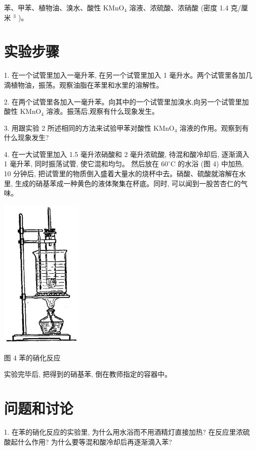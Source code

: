 \documentclass[10pt]{article}
\begin{document}
苯、甲苯、植物油、溴水、酸性 \({\mathrm{{KMnO}}}_{4}\) 溶液、浓硫酸、浓硝酸 (密度 1.4 克/厘米 \({}^{3}\) )。

\section*{实验步骤}

1. 在一个试管里加入一毫升苯, 在另一个试管里加入 1 毫升水。两个试管里各加几滴植物油，振荡。观察油脂在苯里和水里的溶解性。

2. 在两个试管里各加入一毫升苯。向其中的一个试管里加溴水,向另一个试管里加酸性 \({\mathrm{{KMnO}}}_{4}\) 溶液。振荡后,观察有什么现象发生。

3. 用跟实验 2 所述相同的方法来试验甲苯对酸性 \({\mathrm{{KMnO}}}_{4}\) 溶液的作用。观察到有什么现象发生?

4. 在一大试管里加入 1.5 毫升浓硝酸和 2 毫升浓硫酸, 待混和酸冷却后, 逐渐滴入 1 毫升苯, 同时振荡试管, 使它混和均匀。 然后放在 \({60}^{ \circ }\mathrm{C}\) 的水浴 (图 4) 中加热, 10 分钟后, 把试管里的物质倒入盛着大量水的烧杯中去。硝酸、硫酸就溶解在水里, 生成的硝基苯成一种黄色的液体聚集在杯底。同时, 可以闻到一股苦杏仁的气味。

\begin{center}
\includegraphics[max width=0.3\textwidth]{images/01912d16-be99-77bb-9535-4f3ed8d9946f_215_733435.jpg}
\end{center}

图 4 苯的硝化反应

实验完毕后, 把得到的硝基苯, 倒在教师指定的容器中。

\section*{问题和讨论}

1. 在苯的硝化反应的实验里, 为什么用水浴而不用酒精灯直接加热? 在反应里浓硫酸起什么作用? 为什么要等混和酸冷却后再逐渐滴入苯?
\end{document}
